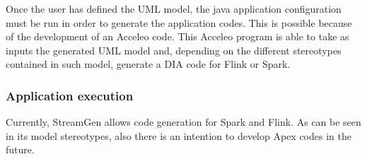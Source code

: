Once the user has defined the UML model, the java application configuration must be run in order to generate the application codes. This is possible because of the development of an Acceleo code. This Acceleo program is able to take as inputs the generated UML model and, depending on the different stereotypes contained in such model, generate a DIA code for Flink or Spark.

\subsubsection*{Application execution}

Currently, StreamGen allows code generation for Spark and Flink. As can be seen in its model stereotypes, also there is an intention to develop Apex codes in the future.















